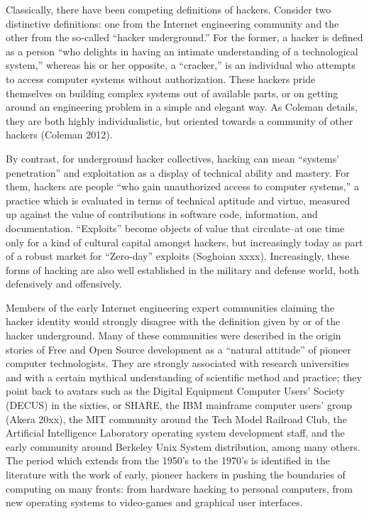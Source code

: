 \documentclass[10pt,letter,oneside]{scrartcl}
\begin{document}
Classically, there have been competing definitions of hackers.  Consider two distinctive definitions: one from the Internet engineering community and the other from the so-called ``hacker underground.''  For the former, a hacker is defined as a person ``who delights in having an intimate understanding of a technological system,'' whereas his or her opposite, a ``cracker,'' is an individual who attempts to access computer systems without authorization.  These hackers pride themselves on building complex systems out of available parts, or on getting around an engineering problem in a simple and elegant way.  As Coleman details, they are both highly individualistic, but oriented towards a community of other hackers (Coleman 2012).

By contrast, for underground hacker collectives, hacking can mean ``systems' penetration'' and exploitation as a  display of technical ability and mastery.  For them, hackers are people ``who gain unauthorized access to computer systems,'' a practice which is evaluated in terms of technical aptitude and virtue, measured up against the value of contributions in software code, information, and documentation.   ``Exploits'' become objects of value that circulate--at one time only for a kind of cultural capital amongst hackers, but increasingly today as part of a robust market for ``Zero-day'' exploits (Soghoian xxxx).   Increasingly, these forms of hacking are also well established in the military and defense world, both defensively and offensively.

Members of the early Internet engineering expert communities claiming the hacker identity would strongly disagree with the definition given by or of the hacker underground. Many of these communities were described in the origin stories of Free and Open Source development as a ``natural attitude'' of pioneer computer technologists.  They are strongly associated with research universities and with a certain mythical understanding of scientific method and practice; they point back to avatars such as the Digital Equipment Computer Users' Society (DECUS) in the sixties, or SHARE, the IBM mainframe computer users' group (Akera 20xx), the MIT community around the Tech Model Railroad Club, the Artificial Intelligence Laboratory operating system development staff, and the early community around Berkeley Unix System distribution, among many others.  The period which extends from the 1950's to the 1970's is identified in the literature with the work of early, pioneer hackers in pushing the boundaries of computing on many fronts: from hardware hacking to personal computers, from new operating systems to video-games and graphical user interfaces.
\end{document}
